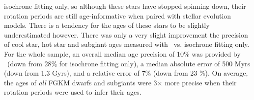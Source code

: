 isochrone fitting only, so although these stars have stopped spinning down,
their rotation periods are still age-informative when paired with stellar
evolution models.
There is a tendency for the ages of these stars to be slightly underestimated
however.
There was only a very slight improvement the precision of cool star, hot star
and subgiant ages measured with \sd\ vs. isochrone
fitting only.
For the whole sample, an overall median age precision of 10\% was provided by
\sd\ (down from 28\% for isochrone fitting only), a median absolute error of
500 Myrs (down from 1.3 Gyrs), and a relative error of 7\% (down from 23 \%).
On average, the ages of {\it all} FGKM dwarfs and subgiants were 3$\times$
more precise when their rotation periods were used to infer their ages.
